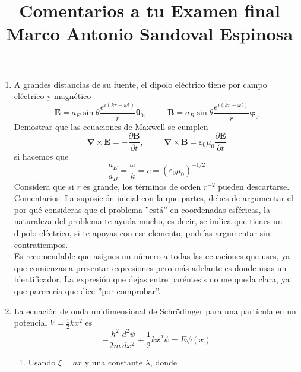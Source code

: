 
\usepackage{enumerate}
\usepackage{pifont}
\renewcommand{\labelitemi}{\ding{43}}
\title{Comentarios a tu Examen final \\ Marco Antonio Sandoval Espinosa}
\date{ }

\renewcommand\labelenumii{\theenumi.{\arabic{enumii}})}
\maketitle
\fontsize{14}{14}\selectfont
\begin{enumerate}
\item A grandes distancias de su fuente, el dipolo eléctrico tiene por campo eléctrico y magnético
\[  \mathbf{E} =a_{E} \sin \theta \dfrac{e^{i(k r - \omega t)}}{r} \bm{\theta}_{0}, \hspace{1cm} \mathbf{B} = a_{B} \sin \theta \dfrac{e^{i(k r-\omega t)}}{r} \bm{\varphi}_{0} \]
Demostrar que las ecuaciones de Maxwell se cumplen
\[ \bm{\nabla \times E} =  -\dfrac{\partial \bm{B}}{\partial t}, \hspace{1cm} \bm{\nabla \times B} =  \varepsilon_{0} \mu_{0} \dfrac{\partial \bm{E}}{\partial t}\]
si hacemos que
\[ \dfrac{a_{E}}{a_{B}} = \dfrac{\omega}{k} =  c = (\varepsilon_{0} \mu_{0})^{-1/2} \]
Considera que si $r$ es grande, los términos de orden $r^{-2}$ pueden descartarse.
\\
Comentarios: La suposición inicial con la que partes, debes de argumentar el por qué consideras que el problema ''está'' en coordenadas esféricas, la naturaleza del problema te ayuda mucho, es decir, se indica que tienes un dipolo eléctrico, si te apoyas con ese elemento, podrías argumentar sin contratiempos.
\\
Es recomendable que asignes un número a todas las ecuaciones que uses, ya que comienzas a presentar expresiones pero más adelante es donde usas un identificador. La expresión que dejas entre paréntesis no me queda clara, ya que parecería que dice ''por comprobar''.
\item La ecuación de onda unidimensional de Schrödinger para una partícula en un potencial $V=\frac{1}{2} k x^{2}$ es
\[ - \dfrac{\hbar^{2}}{2m} \dfrac{d^{2} \psi}{d x^{2}} + \dfrac{1}{2} k x^{2} \psi =  E \psi(x)\]
\begin{enumerate}
\item Usando $\xi = ax$ y una constante $\lambda$, donde
\begin{eqnarray*}

\end{eqnarray*}
\end{enumerate}
\end{enumerate}
